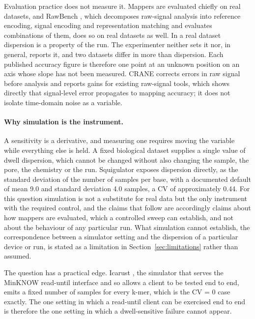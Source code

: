\documentclass[11pt,a4paper]{article}
\begin{document}
Evaluation practice does not measure it. Mappers are evaluated chiefly on real datasets, and
RawBench \citep{eris2025rawbench}, which decomposes raw-signal analysis into reference encoding,
signal encoding and representation matching and evaluates combinations of them, does so on real
datasets as well. In a real dataset dispersion is a property of the run. The experimenter neither
sets it nor, in general, reports it, and two datasets differ in more than dispersion. Each
published accuracy figure is therefore one point at an unknown position on an axis whose slope has
not been measured. CRANE \citep{ambrozak2026crane} corrects errors in raw signal before analysis
and reports gains for existing raw-signal tools, which shows directly that signal-level error
propagates to mapping accuracy; it does not isolate time-domain noise as a variable.

\paragraph{Why simulation is the instrument.} A sensitivity is a derivative, and measuring one
requires moving the variable while everything else is held. A fixed biological dataset supplies a
single value of dwell dispersion, which cannot be changed without also changing the sample, the
pore, the chemistry or the run. Squigulator \citep{gamaarachchi2024squigulator} exposes
dispersion directly, as the standard deviation of the number of samples per base, with a
documented default of mean 9.0 and standard deviation 4.0 samples, a CV of approximately 0.44. For
this question simulation is not a substitute for real data but the only instrument with the
required control, and the claims that follow are accordingly claims about how mappers are
evaluated, which a controlled sweep can establish, and not about the behaviour of any particular
run. What simulation cannot establish, the correspondence between a simulator setting and the
dispersion of a particular device or run, is stated as a limitation in
Section~\ref{sec:limitations} rather than assumed.

The question has a practical edge. Icarust \citep{munro2024icarust}, the simulator that serves the
MinKNOW read-until interface and so allows a client to be tested end to end, emits a fixed number
of samples for every k-mer, which is the CV = 0 case exactly. The one setting in which a
read-until client can be exercised end to end is therefore the one setting in which a
dwell-sensitive failure cannot appear.
\end{document}
